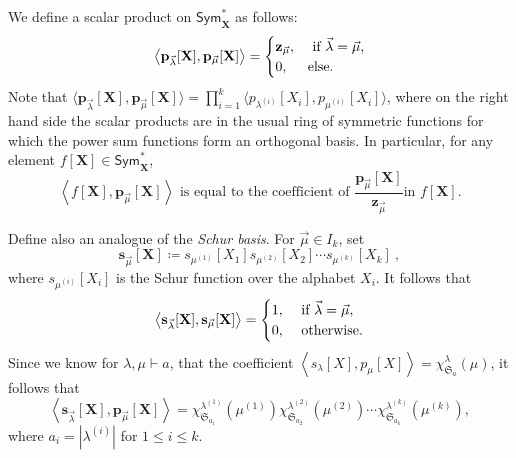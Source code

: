 \documentclass[10pt]{amsart}
\theoremstyle{definition}
\theoremstyle{remark}
\newcommand{\defncolor}{\color{darkred}}
\newcommand{\defn}[1]{{\defncolor\emph{#1}}} %
\newcommand{\XXX}{\mathbf{X}}
\begin{document}
We define a scalar product on $\mathsf{Sym}^\ast_{\XXX}$ as follows:
\begin{equation}\label{eq:defspsym}
    \left< \mathbf{p}_{\vec{\lambda}}[\XXX], \mathbf{p}_{\vec{\mu}}[\XXX] \right> =
    \begin{cases}\mathbf{z}_{\vec{\mu}}, &\hbox{ if }\vec{\lambda} = \vec{\mu},\\
    0,&\hbox{else.}\end{cases}
\end{equation}
Note that $\big\langle \mathbf{p}_{\vec{\lambda}}[\XXX], \mathbf{p}_{\vec{\mu}}[\XXX] \big\rangle
= \prod_{i=1}^{k} \big\langle p_{\lambda^{(i)}}[X_i], p_{\mu^{(i)}}[X_i] \big\rangle$,
where on the right hand side the scalar products are in the
usual ring of symmetric functions for which the power sum functions form an orthogonal basis.
In particular, for any element $f[\XXX] \in \mathsf{Sym}^\ast_\XXX$,
\begin{equation}
\label{eq:scalar-product-with-power-sums}
\text{$\left< f[\XXX], \mathbf{p}_{\vec{\mu}}[\XXX] \right>$ is equal
to the coefficient of $\frac{\mathbf{p}_{\vec{\mu}}[\XXX]}{\mathbf{z}_{\vec{\mu}}}$
in $f[\XXX]$.}
\end{equation}

Define also an analogue of the \defn{Schur basis}.  For
$\vec{\mu} \in I_k$, set
\[
    \mathbf{s}_{\vec{\mu}}[\XXX] \coloneqq
    s_{\mu^{(1)}}[X_1] s_{\mu^{(2)}}[X_2] \cdots s_{\mu^{(k)}}[X_k]~,
\]
where $s_{\mu^{(i)}}[X_i]$ is the Schur function over the alphabet $X_i$.
It follows that
\begin{equation}\label{eq:sorthonormal}
    \left< \mathbf{s}_{\vec{\lambda}}[\XXX],
    \mathbf{s}_{\vec{\mu}}[\XXX] \right> =
    \begin{cases}
    1,&\hbox{ if }\vec{\lambda} = \vec{\mu},\\
    0,&\hbox{ otherwise.}
    \end{cases}
\end{equation}
Since we know for $\lambda, \mu \vdash a$, that the coefficient $\left< s_\lambda[X], p_\mu[X] \right> = \chi^{\lambda}_{\mathfrak{S}_a}(\mu)$, 
it follows that 
\begin{equation}\label{eq:spval}
\left< \mathbf{s}_{\vec{\lambda}}[\XXX],
\mathbf{p}_{\vec{\mu}}[\XXX] \right> =
\chi^{\lambda^{(1)}}_{\mathfrak{S}_{a_1}}(\mu^{(1)})
\chi^{\lambda^{(2)}}_{\mathfrak{S}_{a_2}}(\mu^{(2)})
\cdots
\chi^{\lambda^{(k)}}_{\mathfrak{S}_{a_k}}(\mu^{(k)}),
\end{equation}
where $a_i = |\lambda^{(i)}|$ for $1 \leqslant i \leqslant k$.
\end{document}

